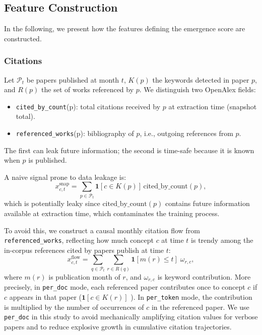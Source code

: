 \documentclass[pdflatex,sn-basic]{sn-jnl}
\begin{document}
\subsection{Feature Construction}
In the following, we present how the features defining the emergence score are constructed.
\subsubsection{Citations}

Let \(\mathcal{P}_t\) be papers published at month \(t\), \(K(p)\) the keywords detected in paper \(p\), and \(R(p)\) the set of works referenced by \(p\).
We distinguish two OpenAlex fields:
\begin{itemize}
    \item \texttt{cited\_by\_count}(p): total citations received by \(p\) at extraction time (snapshot total).
    \item \texttt{referenced\_works}(p): bibliography of \(p\), i.e., outgoing references from \(p\).
\end{itemize}
The first can leak future information; the second is time-safe because it is known when \(p\) is published.

A naive signal prone to data leakage is:
\[
x^{\mathrm{snap}}_{c,t}
=
\sum_{p \in \mathcal{P}_t}
\mathbf{1}[c \in K(p)] \,\mathrm{cited\_by\_count}(p),
\]
which is potentially leaky since \(\mathrm{cited\_by\_count}(p)\) contains future information available at extraction time, which contaminates the training process.

To avoid this, we construct a causal monthly citation flow from \texttt{referenced\_works}, reflecting how much concept \(c\) at time \(t\) is trendy among the in-corpus references cited by papers publish at time \(t\):
\[
x^{\mathrm{flow}}_{c,t}
=
\sum_{q \in \mathcal{P}_t}
\sum_{r \in R(q)}
\mathbf{1}[m(r)\le t]\;\omega_{r,c},
\]
where \(m(r)\) is publication month of \(r\), and \(\omega_{r,c}\) is keyword contribution.
More precisely, in \texttt{per\_doc} mode, each referenced paper contributes once to concept \(c\) if \(c\) appears in that paper (\(\mathbf{1}[c\in K(r)]\) ).
In \texttt{per\_token} mode, the contribution is multiplied by the number of occurrences of \(c\) in the referenced paper.
We use \texttt{per\_doc} in this study to avoid mechanically amplifying citation values for verbose papers and to reduce explosive growth in cumulative citation trajectories.
\end{document}
